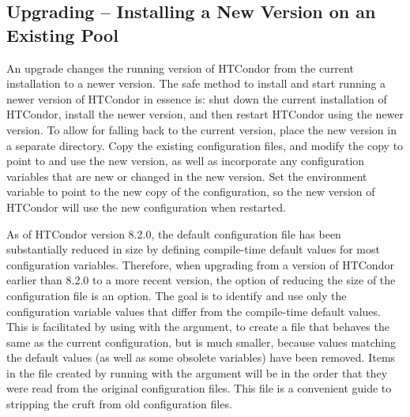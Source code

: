 

\subsection{\label{sec:Pool-Upgrade}
Upgrading -- Installing a New Version on an Existing Pool}

An upgrade changes the running version of HTCondor
from the current installation to a newer version.
The safe method
to install and start running a newer version of HTCondor
in essence is:
shut down the current installation of HTCondor,
install the newer version,
and then restart HTCondor using the newer version.
To allow for falling back to the current version,
place the new version in a separate directory.
Copy the existing configuration files,
and modify the copy to point to and use the new version,
as well as incorporate any configuration variables that are new or changed
in the new version.
Set the  environment variable
to point to the new copy of the configuration,
so the new version of HTCondor will use the new configuration when restarted.

As of HTCondor version 8.2.0, 
the default configuration file has been substantially reduced
in size by defining compile-time default values for most configuration
variables.
Therefore,
when upgrading from a version of HTCondor earlier than 8.2.0 
to a more recent version,
the option of reducing the size of the configuration file is an option.
The goal is to identify and use only
the configuration variable values that differ from 
the compile-time default values.  
This is facilitated by using  with 
the  argument,
to create a file that behaves the same as the current configuration, 
but is much smaller,
because values matching the default values (as well as some obsolete variables)
have been removed.
Items in the file created by running
 with the  argument
will be in the order that they were read from the original configuration files.
This file is a convenient guide to stripping the cruft from 
old configuration files.

